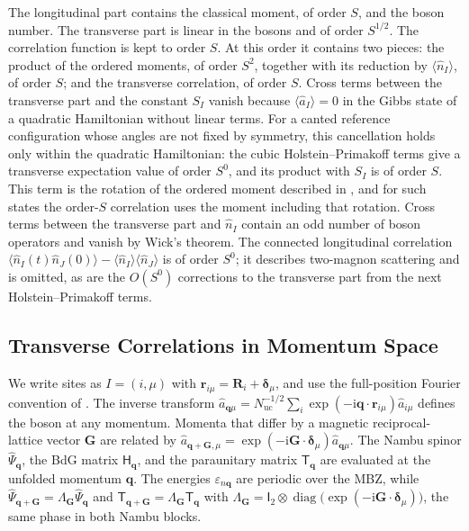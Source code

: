 The longitudinal part contains the classical moment, of order \(S\), and the boson number. The transverse part is linear in the bosons and of order \(S^{1/2}\). The correlation function is kept to order \(S\). At this order it contains two pieces: the product of the ordered moments, of order \(S^2\), together with its reduction by \(\langle\hat n_I\rangle\), of order \(S\); and the transverse correlation, of order \(S\). Cross terms between the transverse part and the constant \(S_I\) vanish because \(\langle\hat a_I\rangle=0\) in the Gibbs state of a quadratic Hamiltonian without linear terms. For a canted reference configuration whose angles are not fixed by symmetry, this cancellation holds only within the quadratic Hamiltonian: the cubic Holstein--Primakoff terms give a transverse expectation value of order \(S^0\), and its product with \(S_I\) is of order \(S\). This term is the rotation of the ordered moment described in , and for such states the order-\(S\) correlation uses the moment including that rotation. Cross terms between the transverse part and \(\hat n_I\) contain an odd number of boson operators and vanish by Wick's theorem. The connected longitudinal correlation \(\langle\hat n_I(t)\hat n_J(0)\rangle-\langle\hat n_I\rangle\langle\hat n_J\rangle\) is of order \(S^0\); it describes two-magnon scattering and is omitted, as are the \(O(S^0)\) corrections to the transverse part from the next Holstein--Primakoff terms.

\subsection{Transverse Correlations in Momentum Space}

We write sites as \(I=(i,\mu)\) with \(\mathbf r_{i\mu}=\mathbf R_i+\boldsymbol\delta_\mu\), and use the full-position Fourier convention of . The inverse transform \(\hat a_{\mathbf q\mu}=N_{\mathrm{uc}}^{-1/2}\sum_i\exp(-\mathrm i\mathbf q\cdot\mathbf r_{i\mu})\hat a_{i\mu}\) defines the boson at any momentum. Momenta that differ by a magnetic reciprocal-lattice vector \(\mathbf G\) are related by \(\hat a_{\mathbf q+\mathbf G,\mu}=\exp(-\mathrm i\mathbf G\cdot\boldsymbol\delta_\mu)\hat a_{\mathbf q\mu}\). The Nambu spinor \(\hat\Psi_{\mathbf q}\), the BdG matrix \(\mathsf H_{\mathbf q}\), and the paraunitary matrix \(\mathsf T_{\mathbf q}\) are evaluated at the unfolded momentum \(\mathbf q\). The energies \(\varepsilon_{n\mathbf q}\) are periodic over the MBZ, while \(\hat\Psi_{\mathbf q+\mathbf G}=\Lambda_{\mathbf G}\hat\Psi_{\mathbf q}\) and \(\mathsf T_{\mathbf q+\mathbf G}=\Lambda_{\mathbf G}\mathsf T_{\mathbf q}\) with \(\Lambda_{\mathbf G}=\mathsf I_2\otimes\operatorname{diag}\big(\exp(-\mathrm i\mathbf G\cdot\boldsymbol\delta_\mu)\big)\), the same phase in both Nambu blocks.

